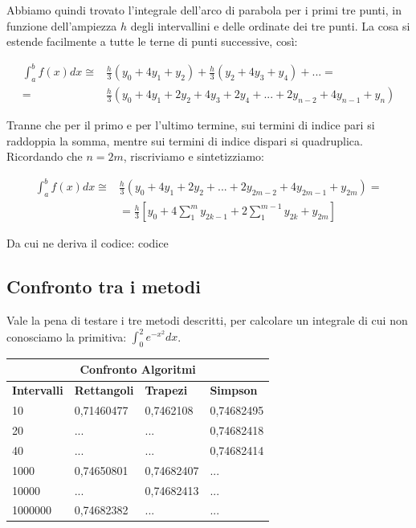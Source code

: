 \documentclass{article}
\begin{document}
Abbiamo quindi trovato l’integrale dell’arco di parabola per i primi tre punti, in funzione dell’ampiezza $h$ degli intervallini e delle ordinate dei tre punti. La cosa si estende facilmente a tutte le terne di punti successive, così:

\begin{align*}
\int_a^bf(x)dx\cong &\frac{h}{3}(y_0+4y_1+y_2)+\frac{h}{3}(y_2+4y_3+y_4)+ ...=\\
=&\frac{h}{3}(y_0+4y_1+2y_2+4y_3+2y_4+ ... +2y_{n-2}+4y_{n-1}+y_n)
\end{align*}

Tranne che per il primo e per l’ultimo termine, sui termini di indice pari si raddoppia la somma, mentre sui termini di indice dispari si quadruplica. Ricordando che $n=2m$, riscriviamo e sintetizziamo:

\begin{align*}
\int_a^bf(x)dx\cong &\frac{h}{3}(y_0+4y_1+2y_2+ ... +2y_{2m-2}+4y_{2m-1}+y_{2m})=\\
&=\frac{h}{3}\left[y_0+4\sum_1^m y_{2k-1}+2\sum_1^{m-1}y_{2k}+y_{2m} \right]
\end{align*}

Da cui ne deriva il codice: 
codice

\subsection{Confronto tra i metodi}

Vale la pena di testare i tre metodi descritti, per calcolare un integrale di cui non conosciamo la primitiva: $\int_0^2e^{-x^2}dx$.

\hfill

\begin{tabular}{ |p{3cm}||p{3cm}|p{3cm}|p{3cm}|  }
 \hline
 \multicolumn{4}{|c|}{Confronto Algoritmi} \\
 \hline
 \textbf{Intervalli}& \textbf{Rettangoli} & \textbf{Trapezi}& \textbf{Simpson}\\
 \hline
10  & 0,71460477    &0,7462108&  0,74682495\\
 20&   ...  & ...  &0,74682418\\
 40 &... & ...&  0,74682414\\
 1000    &0,74650801 & 0,74682407&  ...\\
 10000&   ...  & 0,74682413 & ...
\\
 1000000& 0,74682382  & ...   &...\\
 \hline
\end{tabular}
\end{document}

